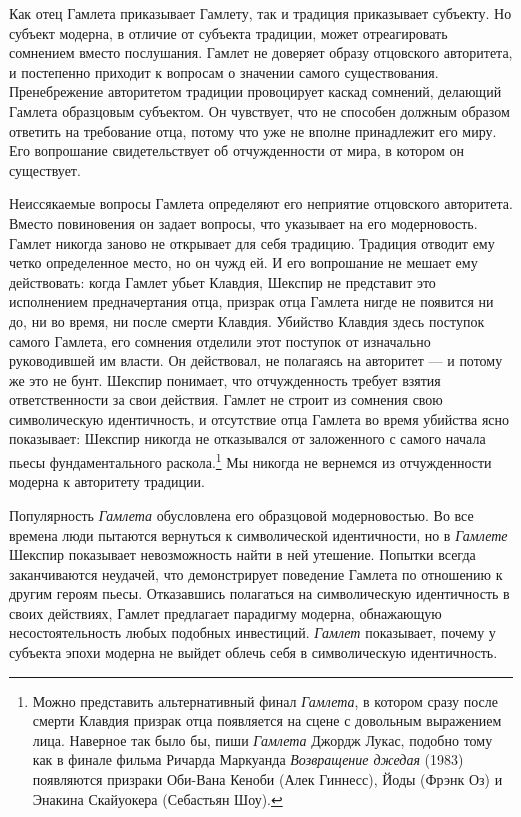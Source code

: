 \documentclass[12pt]{book}
\begin{document}
Как отец Гамлета приказывает Гамлету, так и традиция приказывает субъекту. Но субъект модерна, в отличие от субъекта традиции, может отреагировать сомнением вместо послушания. Гамлет не доверяет образу отцовского авторитета, и постепенно приходит к вопросам о значении самого существования. Пренебрежение авторитетом традиции провоцирует каскад сомнений, делающий Гамлета образцовым субъектом. Он чувствует, что не способен должным образом ответить на требование отца, потому что уже не вполне принадлежит его миру. Его вопрошание свидетельствует об отчужденности от мира, в котором он существует.

Неиссякаемые вопросы Гамлета определяют его неприятие отцовского авторитета. Вместо повиновения он задает вопросы, что указывает на его модерновость. Гамлет никогда заново не открывает для себя традицию. Традиция отводит ему четко определенное место, но он чужд ей. И его вопрошание не мешает ему действовать: когда Гамлет убьет Клавдия, Шекспир не представит это исполнением предначертания отца, призрак отца Гамлета нигде не появится ни до, ни во время, ни после смерти Клавдия. Убийство Клавдия здесь поступок самого Гамлета, его сомнения отделили этот поступок от изначально руководившей им власти. Он действовал, не полагаясь на авторитет --- и потому же это не бунт. Шекспир понимает, что отчужденность требует взятия ответственности за свои действия. Гамлет не строит из сомнения свою символическую идентичность, и отсутствие отца Гамлета во время убийства ясно показывает: Шекспир никогда не отказывался от заложенного с самого начала пьесы фундаментального раскола.\footnote{Можно представить альтернативный финал \textit{Гамлета}, в котором сразу после смерти Клавдия призрак отца появляется на сцене с довольным выражением лица. Наверное так было бы, пиши \textit{Гамлета} Джордж Лукас, подобно тому как в финале фильма Ричарда Маркуанда \textit{Возвращение джедая} (1983) появляются призраки Оби-Вана Кеноби (Алек Гиннесс), Йоды (Фрэнк Оз) и Энакина Скайуокера (Себастьян Шоу).} Мы никогда не вернемся из отчужденности модерна к авторитету традиции.

Популярность \textit{Гамлета} обусловлена его образцовой модерновостью. Во все времена люди пытаются вернуться к символической идентичности, но в \textit{Гамлете} Шекспир показывает невозможность найти в ней утешение. Попытки всегда заканчиваются неудачей, что демонстрирует поведение Гамлета по отношению к другим героям пьесы. Отказавшись полагаться на символическую идентичность в своих действиях, Гамлет предлагает парадигму модерна, обнажающую несостоятельность любых подобных инвестиций. \textit{Гамлет} показывает, почему у субъекта эпохи модерна не выйдет облечь себя в символическую идентичность.
\end{document}
